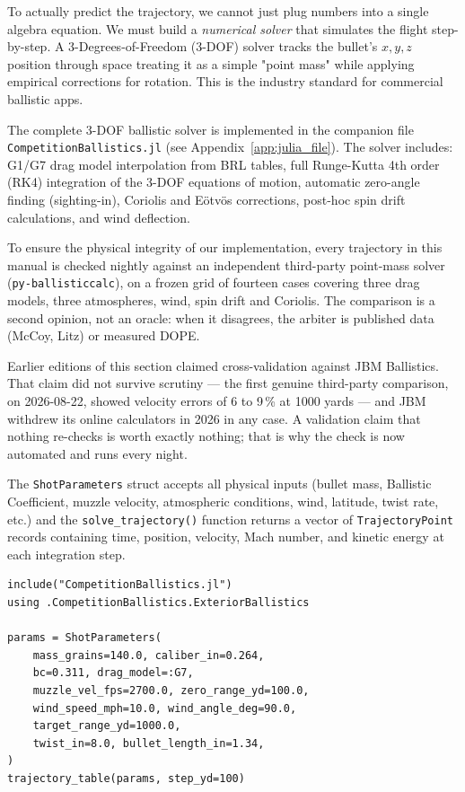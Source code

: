 \documentclass[11pt,twoside,openright]{report}
\begin{document}
To actually predict the trajectory, we cannot just plug numbers into a single algebra equation. We must build a \emph{numerical solver} that simulates the flight step-by-step. A 3-Degrees-of-Freedom (3-DOF) solver tracks the bullet's $x, y, z$ position through space treating it as a simple "point mass" while applying empirical corrections for rotation. This is the industry standard for commercial ballistic apps.

The complete 3-DOF ballistic solver is implemented in the companion file \texttt{CompetitionBallistics.jl} (see Appendix~\ref{app:julia_file}). The solver includes: G1/G7 drag model interpolation from BRL tables, full Runge-Kutta 4th order (RK4) integration of the 3-DOF equations of motion, automatic zero-angle finding (sighting-in), Coriolis and E\"otv\"os corrections, post-hoc spin drift calculations, and wind deflection. 

To ensure the physical integrity of our implementation, every trajectory in this
manual is checked nightly against an independent third-party point-mass solver
(\texttt{py-ballisticcalc}), on a frozen grid of fourteen cases covering three drag
models, three atmospheres, wind, spin drift and Coriolis. The comparison is a second
opinion, not an oracle: when it disagrees, the arbiter is published data (McCoy, Litz)
or measured DOPE.

Earlier editions of this section claimed cross-validation against JBM Ballistics. That
claim did not survive scrutiny --- the first genuine third-party comparison, on
2026-08-22, showed velocity errors of 6 to 9\,\% at 1000 yards --- and JBM withdrew its
online calculators in 2026 in any case. A validation claim that nothing re-checks is
worth exactly nothing; that is why the check is now automated and runs every night.

The \texttt{ShotParameters} struct accepts all physical inputs (bullet mass, Ballistic Coefficient, muzzle velocity, atmospheric conditions, wind, latitude, twist rate, etc.) and the \texttt{solve\_trajectory()} function returns a vector of \texttt{TrajectoryPoint} records containing time, position, velocity, Mach number, and kinetic energy at each integration step.

\begin{lstlisting}[caption={Example: running the 3-DOF solver in Julia},label={lst:solver_example}]
include("CompetitionBallistics.jl")
using .CompetitionBallistics.ExteriorBallistics

params = ShotParameters(
    mass_grains=140.0, caliber_in=0.264,
    bc=0.311, drag_model=:G7,
    muzzle_vel_fps=2700.0, zero_range_yd=100.0,
    wind_speed_mph=10.0, wind_angle_deg=90.0,
    target_range_yd=1000.0,
    twist_in=8.0, bullet_length_in=1.34,
)
trajectory_table(params, step_yd=100)
\end{lstlisting}
\end{document}
